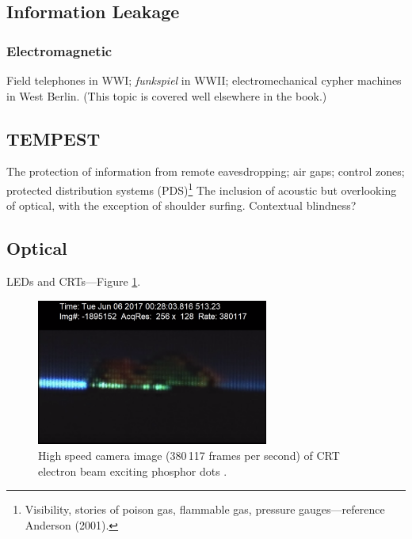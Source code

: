 \documentclass[a4paper,twoside,11pt]{book}
\begin{document}
\subsection{Information Leakage}
\subsubsection{Electromagnetic}
Field telephones in WWI; \emph{funkspiel} in WWII; electromechanical cypher
machines in West Berlin. (This topic is covered well elsewhere in the book.)

\subsection{TEMPEST}
The protection of information from remote eavesdropping; air gaps; control
zones; protected distribution systems (PDS)\footnote{Visibility, stories of
poison gas, flammable gas, pressure gauges---reference Anderson (2001).} The
inclusion of acoustic but overlooking of optical, with the exception of
shoulder surfing. Contextual blindness?
\subsection{Optical}
LEDs and CRTs---Figure \ref{figure:slow-mo_guys_crt}.
\begin{figure}[ht]
  \centering
  \includegraphics[width=3in]{slow-mo_guys_crt.png}
  \caption{High speed camera image (380\,117 frames per second) of CRT electron
    beam exciting phosphor dots \protect\cite{Free2018}.}
  \label{figure:slow-mo_guys_crt}
\end{figure}
\end{document}
